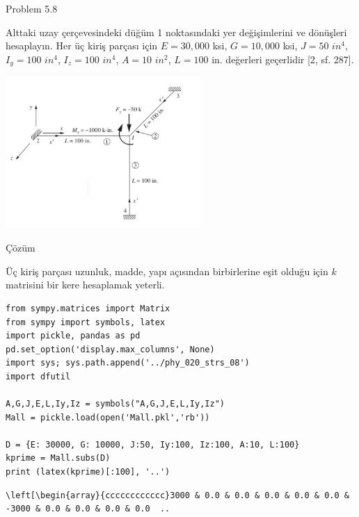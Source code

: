 \documentclass[12pt,fleqn]{article}\usepackage{../../common}
\begin{document}
Problem 5.8

Alttaki uzay çerçevesindeki düğüm 1 noktasındaki yer değişimlerini ve dönüşleri
hesaplayın. Her üç kiriş parçası için $E=30,000$ ksi, $G=10,000$ ksi, $J = 50$
$in^4$, $I_y=100$ $in^4$, $I_z = 100$ $in^4$, $A=10$ $in^2$, $L = 100$ in.
değerleri geçerlidir [2, sf. 287].

\includegraphics[width=20em]{phy_020_strs_11_06.jpg}

Çözüm

Üç kiriş parçası uzunluk, madde, yapı açısından birbirlerine eşit olduğu için
$k$ matrisini bir kere hesaplamak yeterli. 

\begin{verbatim}
from sympy.matrices import Matrix
from sympy import symbols, latex
import pickle, pandas as pd
pd.set_option('display.max_columns', None)
import sys; sys.path.append('../phy_020_strs_08')
import dfutil

A,G,J,E,L,Iy,Iz = symbols("A,G,J,E,L,Iy,Iz")
Mall = pickle.load(open('Mall.pkl','rb'))

D = {E: 30000, G: 10000, J:50, Iy:100, Iz:100, A:10, L:100}
kprime = Mall.subs(D)
print (latex(kprime)[:100], '..')
\end{verbatim}

\begin{verbatim}
\left[\begin{array}{cccccccccccc}3000 & 0.0 & 0.0 & 0.0 & 0.0 & 0.0 & -3000 & 0.0 & 0.0 & 0.0 & 0.0  ..
\end{verbatim}
\end{document}
